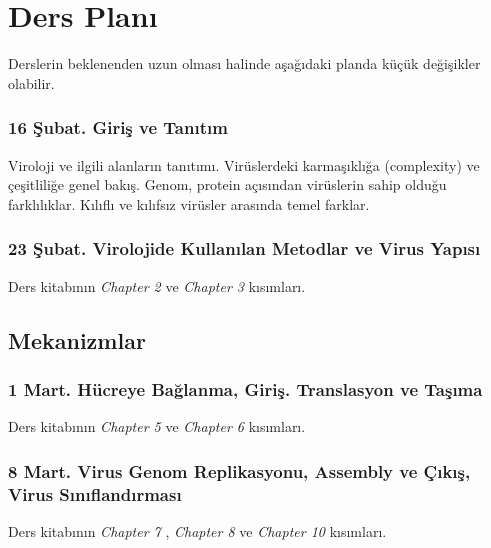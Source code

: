 \section{Ders Planı}\label{ders-planux131}

Derslerin beklenenden uzun olması halinde aşağıdaki planda küçük
değişikler olabilir.

\subsubsection{16 Şubat. Giriş ve
Tanıtım}\label{ux15fubat.-giriux15f-ve-tanux131tux131m}

Viroloji ve ilgili alanların tanıtımı. Virüslerdeki karmaşıklığa
(complexity) ve çeşitliliğe genel bakış. Genom, protein açısından
virüslerin sahip olduğu farklılıklar. Kılıflı ve kılıfsız virüsler
arasında temel farklar.

\subsubsection{23 Şubat. Virolojide Kullanılan Metodlar ve Virus
Yapısı}\label{ux15fubat.-virolojide-kullanux131lan-metodlar-ve-virus-yapux131sux131}

Ders kitabının \emph{Chapter 2} ve \emph{Chapter 3} kısımları.

\subsection{Mekanizmlar}\label{mekanizmlar}

\subsubsection{1 Mart. Hücreye Bağlanma, Giriş. Translasyon ve
Taşıma}\label{mart.-huxfccreye-baux11flanma-giriux15f.-translasyon-ve-taux15fux131ma}

Ders kitabının \emph{Chapter 5} ve \emph{Chapter 6} kısımları.

\subsubsection{8 Mart. Virus Genom Replikasyonu, Assembly ve Çıkış,
Virus
Sınıflandırması}\label{mart.-virus-genom-replikasyonu-assembly-ve-uxe7ux131kux131ux15f-virus-sux131nux131flandux131rmasux131}

Ders kitabının \emph{Chapter 7} , \emph{Chapter 8} ve \emph{Chapter 10}
kısımları.

